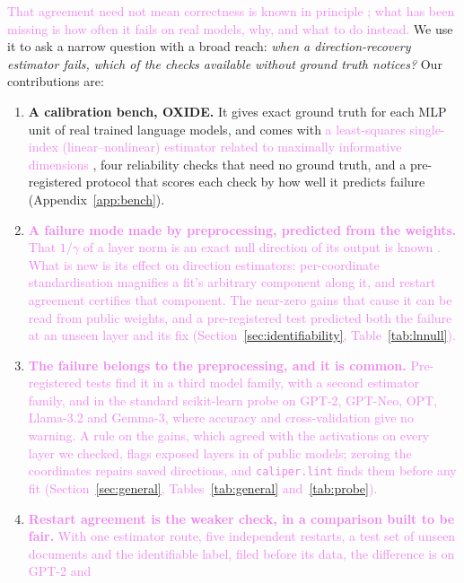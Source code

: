 \documentclass[10pt]{article}
\newcommand{\benchname}{OXIDE}
\newcommand{\draft}[1]{\textcolor{violet}{#1}}
\begin{document}
\draft{That agreement need not mean correctness is known in principle
\citep{nehzati2026restarts,paulo2025sparse}; what has been missing is how often it fails on real
models, why, and what to do instead.} We use it to ask a narrow question with a broad reach: \emph{when a direction-recovery
estimator fails, which of the checks available without ground truth notices?} Our
contributions are:
\begin{enumerate}
  \item \textbf{A calibration bench, \benchname{}.} It gives exact ground truth for each MLP
  unit of real trained language models, and comes with \draft{a least-squares single-index
  (linear--nonlinear) estimator related to maximally informative dimensions}
  \citep{sharpee2004mid,williamson2015equivalence}, four reliability checks that need no ground
  truth, and a pre-registered protocol that scores each check by how well it predicts failure
  (Appendix~\ref{app:bench}).
  \item \draft{\textbf{A failure mode made by preprocessing, predicted from the weights.} That
  $1/\gamma$ of a layer norm is an exact null direction of its output is known
  \citep{shirodkar2026dead}. What is new is its effect on direction estimators: per-coordinate
  standardisation magnifies a fit's arbitrary component along it, and restart agreement certifies
  that component. The near-zero gains that cause it can be read from public weights, and a
  pre-registered test predicted both the failure at an unseen layer and its fix
  (Section~\ref{sec:identifiability}, Table~\ref{tab:lnnull}).}
  \item \draft{\textbf{The failure belongs to the preprocessing, and it is common.} Pre-registered
  tests find it in a third model family, with a second estimator family, and in the standard
  scikit-learn probe on GPT-2, GPT-Neo, OPT, Llama-3.2 and Gemma-3, where accuracy and
  cross-validation give no warning. A rule on the gains, which agreed with the activations on every
  layer we checked, flags exposed layers in \mapExposed{} of \mapModels{} public models; zeroing the
  coordinates repairs saved directions, and \texttt{caliper.lint} finds them before any fit
  (Section~\ref{sec:general}, Tables~\ref{tab:general} and~\ref{tab:probe}).}
  \item \draft{\textbf{Restart agreement is the weaker check, in a comparison built to be fair.}
  With one estimator route, five independent restarts, a test set of unseen documents and the
  identifiable label, filed before its data, the difference is \eOneDelta{} \eOneCI{} on GPT-2 and
}
\end{enumerate}
\end{document}
